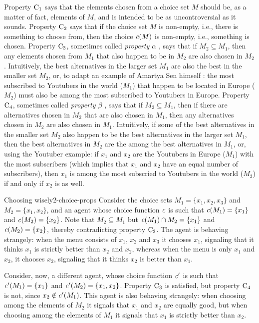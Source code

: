 Property $\mathrm{C}_{1}$ says that the elements chosen from a choice set $M$
should be, as a matter of fact, elements of $M$, and is intended to be 
as uncontroversial as it sounds.
Property $\mathrm{C}_{2}$ says that if the choice set $M$ is non-empty, 
i.e., there is something to choose from,
then the choice $\mathit{c}(M)$ is non-empty,
i.e., something is chosen.
Property $\mathrm{C}_{3}$, sometimes called \emph{property $\alpha$} \cite{Sen69,Sen70},
says that if $M_2\subseteq M_1$, 
then any elements chosen from $M_1$ that also happen to be in $M_2$
are also chosen in $M_2$.
Intuitively, the best alternatives in the larger set $M_{1}$ are also the best in 
the smaller set $M_{2}$,
or, to adapt an example of Amartya Sen himself \cite{Sen70,Sen17}:
the most subscribed to Youtubers in the world ($M_1$) that happen 
to be located in Europe ($M_2$)
must also be among the most subscribed to Youtubers in Europe.
Property $\mathrm{C}_{4}$, sometimes called \emph{property $\beta$} \cite{Sen69,Sen70},
says that if $M_{2} \subseteq M_{1}$, then
if there are alternatives chosen in $M_2$ that are also chosen in $M_{1}$,
then any alternatives chosen in $M_{2}$ are also chosen in $M_{1}$.
Intuitively, if some of the best alternatives in the smaller set $M_{2}$ 
also happen to be the best alternatives in the larger set $M_{1}$,
then the best alternatives in $M_{2}$ are the among the best alternatives
in $M_{1}$,
or, using the Youtuber example:
if $x_1$ and $x_2$ are the Youtubers in Europe ($M_1$) with the most subscribers 
(which implies that $x_1$ and $x_2$ have an equal number of subscribers), 
then $x_1$ is among the most subscried to Youtubers in the world ($M_2$)
if and only if $x_2$ is as well. 

\begin{xmpl}{Choosing wisely}{2-choice-props}
	Consider the choice sets $M_1=\{x_1,x_2,x_3\}$ and $M_2=\{x_1,x_2\}$,
	and an agent whose choice function $\mathit{c}$ is such that 
	$\mathit{c}(M_1)=\{x_1\}$ and $\mathit{c}(M_2)=\{x_2\}$.
	Note that $M_2\subseteq M_1$ but $\mathit{c}(M_1)\cap M_2=\{x_1\}$ and $\mathit{c}(M_2)=\{x_2\}$,
	thereby contradicting property $\mathrm{C}_{3}$.
	The agent is behaving strangely:
	when the menu consists of $x_1$, $x_2$ and $x_3$ it chooses $x_1$,
	signaling that it thinks $x_1$ is strictly better than $x_2$ and $x_2$,
	whereas when the menu is only $x_1$ and $x_2$, it chooses $x_2$,
	signaling that it thinks $x_2$ is better than $x_1$.

	Consider, now, a different agent, whose choice function $\mathit{c}'$
	is such that $\mathit{c}'(M_1)=\{x_1\}$ and $\mathit{c}'(M_2)=\{x_1,x_2\}$.
	Property $\mathrm{C}_{3}$ is satisfied, but property $\mathrm{C}_{4}$ is not, 
	since $x_2\notin\mathit{c}'(M_1)$.
	This agent is also behaving strangely:
	when choosing among the elements of $M_2$ it signals that $x_1$ and $x_2$
	are equally good, but when choosing among the elements of $M_1$
	it signals that $x_1$ is strictly better than $x_2$.
\end{xmpl}

